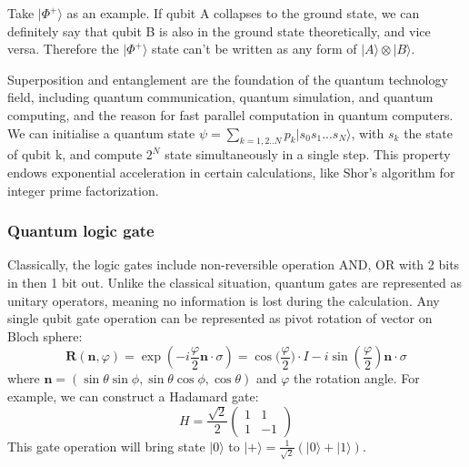 Take $ |\Phi^+\rangle$ as an example. If qubit A collapses to the ground state, we can definitely say that qubit B is also in the ground state theoretically, and vice versa. Therefore the $ |\Phi^+\rangle$ state can't be written as any form of $|A\rangle \otimes|B\rangle$. 

Superposition and entanglement are the foundation of the quantum technology field, including quantum communication, quantum simulation, and quantum computing, and the reason for fast parallel computation in quantum computers. We can initialise a quantum state $\psi = \sum_{k=1,2..N}p_k|s_0s_1...s_N\rangle$, with $s_k$ the state of qubit k, and compute $2^N$ state simultaneously in a single step. This property endows exponential acceleration in certain calculations, like Shor's algorithm for integer prime factorization.

\subsubsection{Quantum logic gate}
Classically, the logic gates include non-reversible operation AND, OR with 2 bits in then 1 bit out. Unlike the classical situation, quantum gates are represented as unitary operators, meaning no information is lost during the calculation. Any single qubit gate operation can be represented as pivot rotation of vector on Bloch sphere:
\begin{equation}
    \mathbf{R}(\mathbf{n}, \varphi) = \exp(-i\frac{\varphi}{2}\mathbf{n}\cdot{\sigma}) = \cos{(\frac{\varphi}{2}})\cdot I - i\sin{(\frac{\varphi}{2})}\mathbf{n}\cdot\sigma
\end{equation}
where $\mathbf{n} = (\sin{\theta}\sin{\phi}, \sin{\theta}\cos{\phi}, \cos{\theta})$ and $\varphi$ the rotation angle. For example, we can construct a Hadamard gate:
\begin{equation}
    H = \frac{\sqrt{2}}{2}
    \begin{pmatrix}
1 & 1 \\
1 & -1 
\end{pmatrix}
\end{equation}
This gate operation will bring state $|0\rangle$ to $|+\rangle = \frac{1}{\sqrt{2}}(|0\rangle+|1\rangle)$. 

